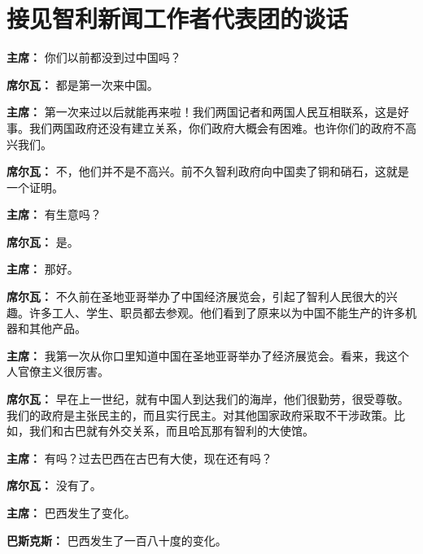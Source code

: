 \section[接见智利新闻工作者代表团的谈话（一九六四年六月二十三日）]{接见智利新闻工作者代表团的谈话}

\begin{duihua}

\item[\textbf{主席：}] 你们以前都没到过中国吗？

\item[\textbf{席尔瓦：}] 都是第一次来中国。

\item[\textbf{主席：}] 第一次来过以后就能再来啦！我们两国记者和两国人民互相联系，这是好事。我们两国政府还没有建立关系，你们政府大概会有困难。也许你们的政府不高兴我们。

\item[\textbf{席尔瓦：}] 不，他们并不是不高兴。前不久智利政府向中国卖了铜和硝石，这就是一个证明。

\item[\textbf{主席：}] 有生意吗？

\item[\textbf{席尔瓦：}] 是。

\item[\textbf{主席：}] 那好。

\item[\textbf{席尔瓦：}] 不久前在圣地亚哥举办了中国经济展览会，引起了智利人民很大的兴趣。许多工人、学生、职员都去参观。他们看到了原来以为中国不能生产的许多机器和其他产品。

\item[\textbf{主席：}] 我第一次从你口里知道中国在圣地亚哥举办了经济展览会。看来，我这个人官僚主义很厉害。

\item[\textbf{席尔瓦：}] 早在上一世纪，就有中国人到达我们的海岸，他们很勤劳，很受尊敬。我们的政府是主张民主的，而且实行民主。对其他国家政府采取不干涉政策。比如，我们和古巴就有外交关系，而且哈瓦那有智利的大使馆。

\item[\textbf{主席：}] 有吗？过去巴西在古巴有大使，现在还有吗？

\item[\textbf{席尔瓦：}] 没有了。

\item[\textbf{主席：}] 巴西发生了变化。

\item[\textbf{巴斯克斯：}] 巴西发生了一百八十度的变化。


\end{duihua}
